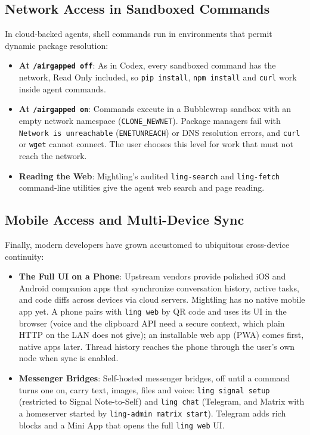 \documentclass[11pt]{article}
\newcommand{\code}[1]{\texttt{#1}}
\newcommand{\agon}{\code{/airgapped on}}
\newcommand{\agoff}{\code{/airgapped off}}
\begin{document}
\subsection{Network Access in Sandboxed Commands}

In cloud-backed agents, shell commands run in environments that permit dynamic package resolution:
\begin{itemize}
    \item \textbf{At \agoff}: As in Codex, every sandboxed command has the network, Read Only included, so
    \code{pip install}, \code{npm install} and \code{curl} work inside agent commands.
    \item \textbf{At \agon}: Commands execute in a Bubblewrap sandbox with an empty network namespace
    (\code{CLONE\_NEWNET}). Package managers fail with \code{Network is unreachable} (\code{ENETUNREACH}) or DNS
    resolution errors, and \code{curl} or \code{wget} cannot connect. The user chooses this level for work that must
    not reach the network.
    \item \textbf{Reading the Web}: Mightling's audited \code{ling-search} and \code{ling-fetch} command-line utilities
    give the agent web search and page reading.
\end{itemize}

\subsection{Mobile Access and Multi-Device Sync}

Finally, modern developers have grown accustomed to ubiquitous cross-device continuity:
\begin{itemize}
    \item \textbf{The Full UI on a Phone}: Upstream vendors provide polished iOS and Android companion apps that
    synchronize conversation history, active tasks, and code diffs across devices via cloud servers. Mightling has no
    native mobile app yet. A phone pairs with \code{ling web} by QR code and uses its UI in the browser (voice and the clipboard API need a
    secure context, which plain HTTP on the LAN does not give); an installable web app
    (PWA) comes first, native apps later. Thread history reaches the phone through the user's own node when sync is
    enabled.
    \item \textbf{Messenger Bridges}: Self-hosted messenger bridges, off until a command turns one on, carry text, images,
    files and voice: \code{ling signal setup} (restricted to Signal Note-to-Self) and \code{ling chat} (Telegram, and
    Matrix with a homeserver started by \code{ling-admin matrix start}). Telegram adds rich blocks and a Mini App that opens
    the full \code{ling web} UI.
\end{itemize}
\end{document}
